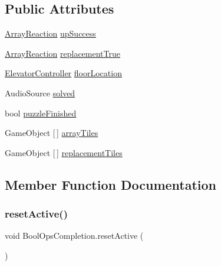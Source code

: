 \subsection*{Public Attributes}
\begin{DoxyCompactItemize}
\item 
\hyperlink{class_array_reaction}{Array\+Reaction} \hyperlink{class_bool_ops_completion_a125b0cee3df92d1129222378c68776de}{up\+Success}
\item 
\hyperlink{class_array_reaction}{Array\+Reaction} \hyperlink{class_bool_ops_completion_a1e2dab96d55c7681be9d553f96fa652f}{replacement\+True}
\item 
\hyperlink{class_elevator_controller}{Elevator\+Controller} \hyperlink{class_bool_ops_completion_a987550dba04494bc4f310799b5f578d6}{floor\+Location}
\item 
Audio\+Source \hyperlink{class_bool_ops_completion_a1d343ac77c80d677ef0872217fcd5dc6}{solved}
\item 
bool \hyperlink{class_bool_ops_completion_a091b63eacef0cfc3a50f79e4a2e98fb2}{puzzle\+Finished}
\item 
Game\+Object \mbox{[}$\,$\mbox{]} \hyperlink{class_bool_ops_completion_a123c64568a207492685649213dd0d25f}{array\+Tiles}
\item 
Game\+Object \mbox{[}$\,$\mbox{]} \hyperlink{class_bool_ops_completion_a5c3233d04c96464e3014aa88e9c2ff37}{replacement\+Tiles}
\end{DoxyCompactItemize}


\subsection{Member Function Documentation}
\mbox{\label{class_bool_ops_completion_a49619737dd343ae03519ff6db1eeebc2}} 
\subsubsection{\texorpdfstring{reset\+Active()}{resetActive()}}
{\footnotesize\ttfamily void Bool\+Ops\+Completion.\+reset\+Active (\begin{DoxyParamCaption}{ }\end{DoxyParamCaption})}

\mbox{\label{class_bool_ops_completion_aa37088b2b4f2f10bffcfdb9accb2fde5}} 
